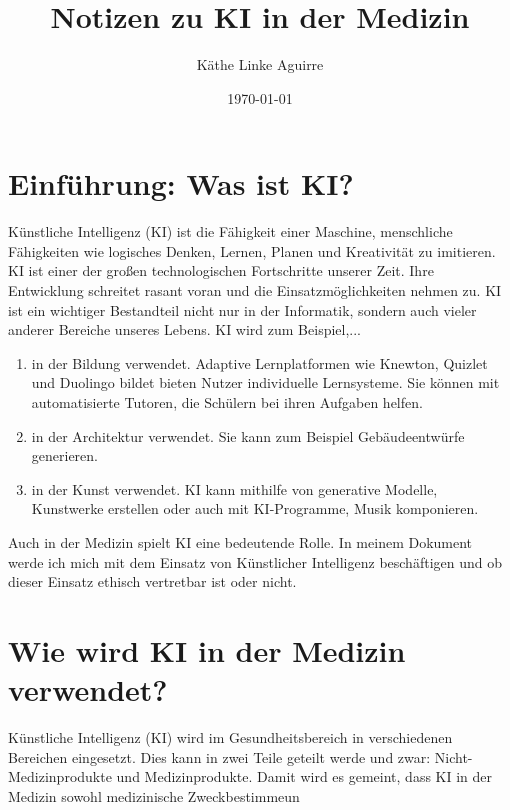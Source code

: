 \documentclass{article}
\title{Notizen zu KI in der Medizin}
\author{Käthe Linke Aguirre}
\date{\today}
\begin{document}
\maketitle


    \tableofcontents

\section { Einführung: Was ist KI? }

   
Künstliche Intelligenz (KI) ist die Fähigkeit einer Maschine, menschliche Fähigkeiten
wie logisches Denken, Lernen, Planen und Kreativität zu imitieren. KI ist einer der 
großen technologischen Fortschritte unserer Zeit. Ihre Entwicklung schreitet 
rasant voran und die Einsatzmöglichkeiten nehmen zu. KI ist ein wichtiger Bestandteil nicht nur in der Informatik,
sondern auch vieler anderer Bereiche unseres Lebens. 
KI wird zum Beispiel,... 
\begin{enumerate}
    \item in der Bildung verwendet. Adaptive Lernplatformen wie Knewton, Quizlet und Duolingo bildet bieten Nutzer individuelle Lernsysteme. Sie können mit automatisierte Tutoren, die Schülern bei ihren Aufgaben helfen.
    \item in der Architektur verwendet. Sie kann zum Beispiel Gebäudeentwürfe generieren.
    \item in der Kunst verwendet. KI kann mithilfe von generative Modelle, Kunstwerke erstellen oder auch mit KI-Programme, Musik komponieren.
\end{enumerate}

Auch in der Medizin spielt KI eine bedeutende Rolle. In meinem Dokument werde ich mich
mit dem Einsatz von Künstlicher Intelligenz beschäftigen und ob dieser Einsatz
ethisch vertretbar ist oder nicht. 


\section{Wie wird KI in der Medizin verwendet?}

Künstliche Intelligenz (KI) wird im Gesundheitsbereich in verschiedenen Bereichen 
eingesetzt. Dies kann in zwei Teile geteilt werde und zwar: Nicht-Medizinprodukte und Medizinprodukte. Damit wird es 
gemeint, dass KI in der Medizin sowohl medizinische Zweckbestimmeun 
\end{document}
